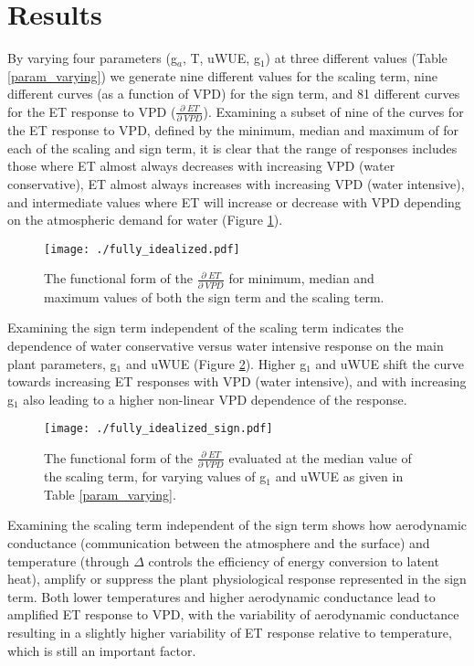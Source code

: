 \section{Results}
\label{results}

By varying four parameters (g$_a$, T, uWUE, g$_1$) at three different
values (Table \ref{param_varying}) we generate nine different values
for the scaling term, nine different curves (as a function of VPD) for
the sign term, and 81 different curves for the ET response to VPD
($\frac{\partial \; ET}{\partial \; VPD}$). Examining a subset of nine
of the curves for the ET response to VPD, defined by the minimum, median
and maximum of for each of the scaling and sign term, it is clear
that the range of responses includes those where ET almost always
decreases with increasing VPD (water conservative), ET almost always
increases with increasing VPD (water intensive), and intermediate
values where ET will increase or decrease with VPD depending on the
atmospheric demand for water (Figure \ref{full}).

\begin{figure}
  \centering \texttt{[image: ./fully\_idealized.pdf]}
  \caption{The functional form of the $\frac{\partial \; ET}{\partial
      \; VPD}$ for minimum, median and maximum values of both the sign
    term and the scaling term.}
  \label{full}
\end{figure}

Examining the sign term independent of the scaling term indicates the
dependence of water conservative versus water intensive response on
the main plant parameters, g$_1$ and uWUE (Figure \ref{sign}). Higher
g$_1$ and uWUE shift the curve towards increasing ET responses with
VPD (water intensive), and with increasing g$_1$ also leading to a
higher non-linear VPD dependence of the response.

\begin{figure}
  \centering \texttt{[image: ./fully\_idealized\_sign.pdf]}
  \caption{The functional form of the $\frac{\partial \; ET}{\partial
      \; VPD}$ evaluated at the median value of the scaling term, for
    varying values of g$_1$ and uWUE as given in Table \ref{param_varying}.}
  \label{sign}
\end{figure}

Examining the scaling term independent of the sign term shows how
aerodynamic conductance (communication between the atmosphere and the
surface) and temperature (through $\Delta$ controls the efficiency of
energy conversion to latent heat), amplify or suppress the plant
physiological response represented in the sign term. Both lower
temperatures and higher aerodynamic conductance lead to amplified ET
response to VPD, with the variability of aerodynamic conductance
resulting in a slightly higher variability of ET response relative to
temperature, which is still an important factor.

